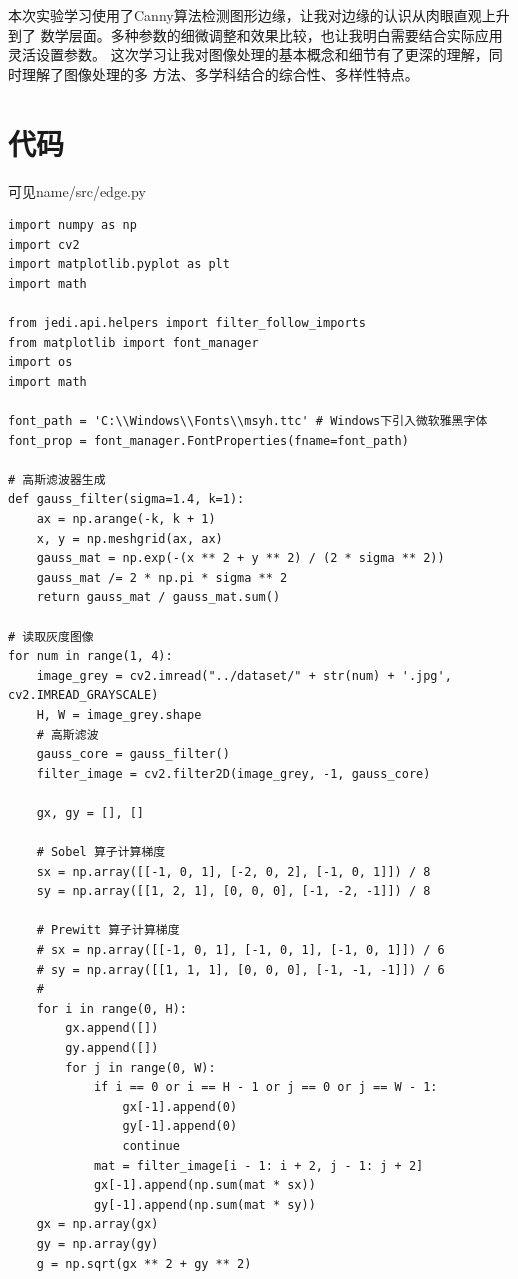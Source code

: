 \documentclass{article}
\begin{document}
    本次实验学习使用了Canny算法检测图形边缘，让我对边缘的认识从肉眼直观上升到了
    数学层面。多种参数的细微调整和效果比较，也让我明白需要结合实际应用灵活设置参数。
    这次学习让我对图像处理的基本概念和细节有了更深的理解，同时理解了图像处理的多
    方法、多学科结合的综合性、多样性特点。

\section{代码}
    可见name/src/edge.py
\begin{lstlisting}
import numpy as np
import cv2
import matplotlib.pyplot as plt
import math

from jedi.api.helpers import filter_follow_imports
from matplotlib import font_manager
import os
import math

font_path = 'C:\\Windows\\Fonts\\msyh.ttc' # Windows下引入微软雅黑字体
font_prop = font_manager.FontProperties(fname=font_path)

# 高斯滤波器生成
def gauss_filter(sigma=1.4, k=1):
    ax = np.arange(-k, k + 1)
    x, y = np.meshgrid(ax, ax)
    gauss_mat = np.exp(-(x ** 2 + y ** 2) / (2 * sigma ** 2))
    gauss_mat /= 2 * np.pi * sigma ** 2
    return gauss_mat / gauss_mat.sum()

# 读取灰度图像
for num in range(1, 4):
    image_grey = cv2.imread("../dataset/" + str(num) + '.jpg', cv2.IMREAD_GRAYSCALE)
    H, W = image_grey.shape
    # 高斯滤波
    gauss_core = gauss_filter()
    filter_image = cv2.filter2D(image_grey, -1, gauss_core)

    gx, gy = [], []

    # Sobel 算子计算梯度
    sx = np.array([[-1, 0, 1], [-2, 0, 2], [-1, 0, 1]]) / 8
    sy = np.array([[1, 2, 1], [0, 0, 0], [-1, -2, -1]]) / 8

    # Prewitt 算子计算梯度
    # sx = np.array([[-1, 0, 1], [-1, 0, 1], [-1, 0, 1]]) / 6
    # sy = np.array([[1, 1, 1], [0, 0, 0], [-1, -1, -1]]) / 6
    #
    for i in range(0, H):
        gx.append([])
        gy.append([])
        for j in range(0, W):
            if i == 0 or i == H - 1 or j == 0 or j == W - 1:
                gx[-1].append(0)
                gy[-1].append(0)
                continue
            mat = filter_image[i - 1: i + 2, j - 1: j + 2]
            gx[-1].append(np.sum(mat * sx))
            gy[-1].append(np.sum(mat * sy))
    gx = np.array(gx)
    gy = np.array(gy)
    g = np.sqrt(gx ** 2 + gy ** 2)


\end{lstlisting}
\end{document}
